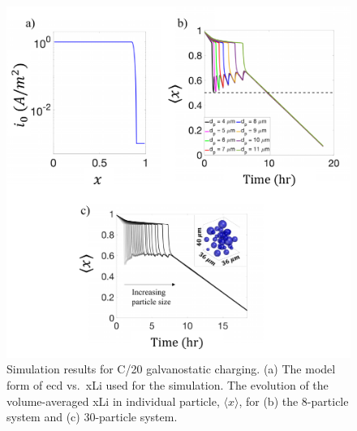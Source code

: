 \documentclass{article}
\begin{document}
\newpage
\begin{figure}[!h]
    \includegraphics[scale =0.7]{figures/modeling_figure_1.pdf}
    \caption{ Simulation results for C/20 galvanostatic
      charging. (a) The model form of \gls{ecd} vs.\ \gls{xLi} used
      for the simulation. The evolution of the volume-averaged
      \gls{xLi} in individual particle, $\langle x \rangle$, for (b)
      the 8-particle system and (c) 30-particle system.}
    \label{fig:model-1}
\end{figure}
\end{document}
